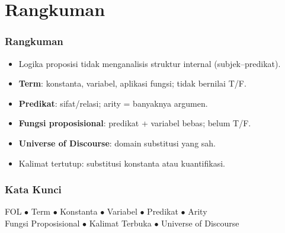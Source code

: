 \documentclass[handout]{beamer}
\theoremstyle{definition}
\theoremstyle{example}
\begin{document}
\section{Rangkuman}

\begin{frame}
\frametitle{Rangkuman}
\begin{itemize}
  \item Logika proposisi tidak menganalisis struktur internal (subjek--predikat).
  \item \textbf{Term}: konstanta, variabel, aplikasi fungsi; tidak bernilai T/F.
  \item \textbf{Predikat}: sifat/relasi; arity = banyaknya argumen.
  \item \textbf{Fungsi proposisional}: predikat + variabel bebas; belum T/F.
  \item \textbf{Universe of Discourse}: domain substitusi yang sah.
  \item Kalimat tertutup: substitusi konstanta atau kuantifikasi.
\end{itemize}
\end{frame}

\begin{frame}
\frametitle{Kata Kunci}
\begin{center}
FOL $\bullet$ Term $\bullet$ Konstanta $\bullet$ Variabel $\bullet$ Predikat $\bullet$ Arity\\
Fungsi Proposisional $\bullet$ Kalimat Terbuka $\bullet$ Universe of Discourse
\end{center}
\end{frame}
\end{document}
